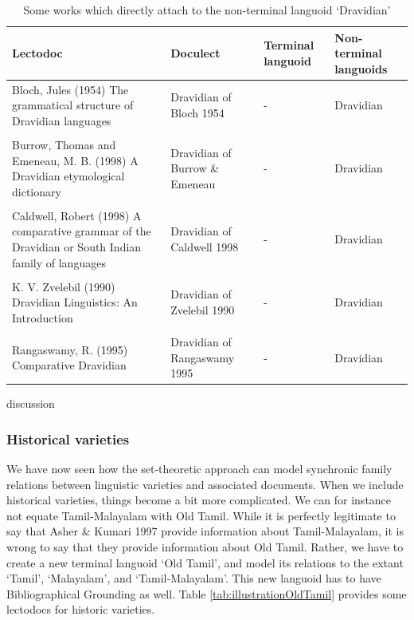 \documentclass[a4paper,10pt]{article}
\begin{document}
\begin{table}
\begin{tabular}{p{5cm}p{2cm}p{2cm}p{4cm}}
Lectodoc & Doculect & Terminal languoid & Non-terminal languoids\\ 
\hline
Bloch, Jules  (1954) The grammatical structure of Dravidian languages & Dravidian of Bloch 1954 & - & Dravidian\\\\
Burrow, Thomas and Emeneau, M. B.  (1998) A Dravidian etymological dictionary & Dravidian of Burrow \& Emeneau & -& Dravidian\\\\
Caldwell, Robert  (1998) A comparative grammar of the Dravidian or South Indian family of languages & Dravidian of Caldwell 1998 & -& Dravidian\\\\
K. V. Zvelebil  (1990) Dravidian Linguistics: An Introduction & Dravidian of Zvelebil 1990 & - & Dravidian \\\\
Rangaswamy, R.  (1995) Comparative Dravidian & Dravidian of Rangaswamy 1995 & - & Dravidian\\
 \end{tabular}
\caption{Some works which directly attach to the non-terminal languoid `Dravidian'}
\label{tab:nonterminallanguoid}
\end{table}

discussion

\subsubsection{Historical varieties}
We have now seen how the set-theoretic approach can model synchronic family relations between linguistic varieties and associated documents. When we include historical varieties, things become a bit more complicated. We can for instance not equate Tamil-Malayalam with Old Tamil. While it is perfectly legitimate to say that Asher \& Kumari 1997 provide information about Tamil-Malayalam, it is wrong to say that they provide information about Old Tamil. Rather, we have to create a new terminal languoid `Old Tamil', and model its relations to the extant `Tamil', `Malayalam', and `Tamil-Malayalam'. This new languoid has to have Bibliographical Grounding as well. Table \ref{tab:illustrationOldTamil} provides some lectodocs for historic varieties.
\end{document}

